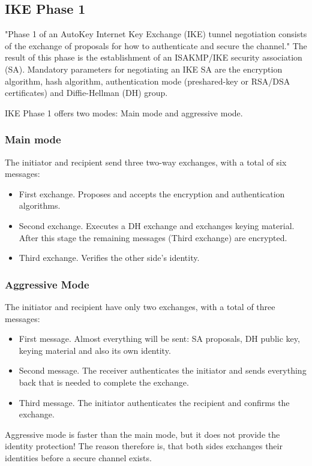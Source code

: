 \documentclass[a4paper]{report}
\begin{document}
\subsection{IKE Phase 1}
\label{ssec:Phase1}
"Phase 1 of an AutoKey Internet Key Exchange (IKE) tunnel negotiation consists of the exchange of proposals for how to authenticate and secure the channel." \parencite{JuniperNetworks2016} The result of this phase is the establishment of an ISAKMP/IKE security association (SA). Mandatory parameters for negotiating an IKE SA are the encryption algorithm, hash algorithm, authentication mode (preshared-key or RSA/DSA certificates) and Diffie-Hellman (DH) group.

IKE Phase 1 offers two modes: Main mode and aggressive mode.
\subsubsection{Main mode}
\label{sssec:Phase1:mainMode}
The initiator and recipient send three two-way exchanges, with a total of six messages:
\begin{itemize}
	\item First exchange. Proposes and accepts the encryption and authentication algorithms.
	\item Second exchange. Executes a DH exchange and exchanges keying material. After this stage  the remaining messages (Third exchange) are encrypted.
	\item Third exchange.  Verifies the other side's identity.
\end{itemize}

\subsubsection{Aggressive Mode}
\label{sssec:Phase1:aggressiveMode}
The initiator and recipient have only two exchanges, with a total of three messages:
\begin{itemize}
	\item First message. Almost everything will be sent: SA proposals, DH public key, keying material and also its own identity.
	\item Second message. The receiver authenticates the initiator and sends everything back that is needed to complete the exchange.
	\item Third message. The initiator authenticates the recipient and confirms the exchange.
\end{itemize}
Aggressive mode is faster than the main mode, but it does not provide the identity protection! The reason therefore is, that both sides exchanges their identities before a secure channel exists. \parencite{JuniperNetworks2016}
\end{document}
